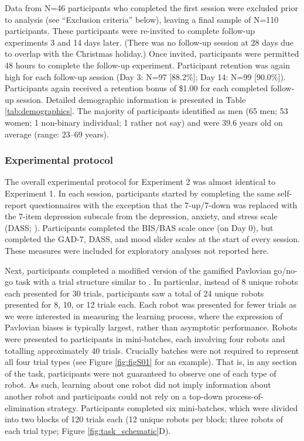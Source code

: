\documentclass[a4paper,12pt]{article}
\begin{document}
\begin{refsection}[main]
Data from N=46 participants who completed the first session were excluded prior to analysis (see ``Exclusion criteria'' below), leaving a final sample of N=110 participants. These participants were re-invited to complete follow-up experiments 3 and 14 days later. (There was no follow-up session at 28 days due to overlap with the Christmas holiday.) Once invited, participants were permitted 48 hours to complete the follow-up experiment. Participant retention was again high for each follow-up session (Day 3: N=97 [88.2\%]; Day 14: N=99 [90.0\%]). Participants again received a retention bonus of \$1.00 for each completed follow-up session. Detailed demographic information is presented in Table \ref{tab:demographics}. The majority of participants identified as men (65 men; 53 women; 1 non-binary individual; 1 rather not say) and were 39.6 years old on average (range: 23--69 years).

\subsubsection*{Experimental protocol}

The overall experimental protocol for Experiment 2 was almost identical to Experiment 1. In each session, participants started by completing the same self-report questionnaires with the exception that the 7-up/7-down was replaced with the 7-item depression subscale from the depression, anxiety, and stress scale (DASS; \cite{henry2005short}). Participants completed the BIS/BAS scale once (on Day 0), but completed the GAD-7, DASS, and mood slider scales at the start of every session. These measures were included for exploratory analyses not reported here.

Next, participants completed a modified version of the gamified Pavlovian go/no-go task with a trial structure similar to \cite{wittmann2008striatal}. In particular, instead of 8 unique robots each presented for 30 trials, participants saw a total of 24 unique robots presented for 8, 10, or 12 trials each. Each robot was presented for fewer trials as we were interested in measuring the learning process, where the expression of Pavlovian biases is typically largest, rather than asymptotic performance. Robots were presented to participants in mini-batches, each involving four robots and totalling approximately 40 trials. Crucially batches were not required to represent all four trial types (see Figure \ref{fig:figS01} for an example). That is, in any section of the task, participants were not guaranteed to observe one of each type of robot. As such, learning about one robot did not imply information about another robot and participants could not rely on a top-down process-of-elimination strategy. Participants completed six mini-batches, which were divided into two blocks of 120 trials each (12 unique robots per block; three robots of each trial type; Figure \ref{fig:task_schematic}D).


\end{refsection}
\end{document}
